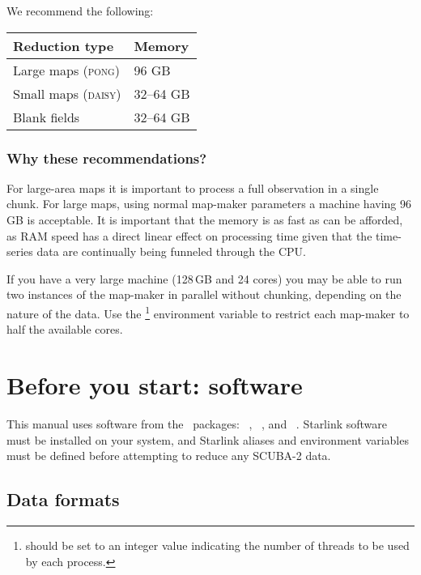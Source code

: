 We recommend the following:
\begin{table}[h!]
  \centering
  \begin{tabular}{ll}
    \hline
    \textbf{Reduction type} &\textbf{Memory} \\
    \hline
    Large maps (\textsc{pong})& 96 GB\\
    Small maps (\textsc{daisy})&32--64 GB\\
    Blank fields&32--64 GB\\
    \hline
  \end{tabular}
\end{table}

\subsubsection*{Why these recommendations?}

For large-area maps it is important to process a full observation in a
single chunk. For large maps, using normal map-maker
parameters a machine having 96\,GB is acceptable. It is important that
the memory is as fast as can be afforded, as RAM speed has a direct
linear effect on processing time given that the time-series data are
continually being funneled through the CPU.

If you have a very large machine (128\,GB and 24 cores) you may be able
to run two instances of the map-maker in parallel without chunking,
depending on the nature of the data. Use
the \footnote{ should be
set to an integer value indicating the number of threads to be used by
each process.} environment variable to restrict each map-maker to half
the available cores.

\section{Before you start: software}

This manual uses software from the \starlink\ packages: \smurf\
\cite{smurf}, \Kappa\ \cite{kappa}, and \gaia\ \cite{gaia}. 
Starlink software must be installed on your system, and Starlink 
aliases and environment variables must be defined before attempting 
to reduce any SCUBA-2 data.

\subsection{Data formats}
\label{sec:ndf}

